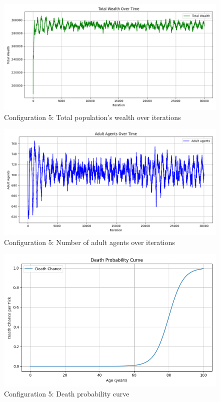 \documentclass[english]{projectreport}
\begin{document}
    \begin{figure}[H]
        \centering
        \includegraphics[width=0.8\linewidth]{metrics_config5/metrics_config5_total_wealth.png}
        \caption{Configuration 5: Total population's wealth over iterations}
        \label{fig:c0-total_wealth}
    \end{figure}

    \begin{figure}[H]
        \centering
        \includegraphics[width=0.8\linewidth]{metrics_config5/metrics_config5_adult_agents.png}
        \caption{Configuration 5: Number of adult agents over iterations}
        \label{fig:c0-adult_agents}
    \end{figure}

    \begin{figure}[H]
        \centering
        \includegraphics[width=0.8\linewidth]{metrics_config5/metrics_config5_death_probability_curve.png}
        \caption{Configuration 5: Death probability curve}
        \label{fig:c0-death_probability_curve}
    \end{figure}
\end{document}
